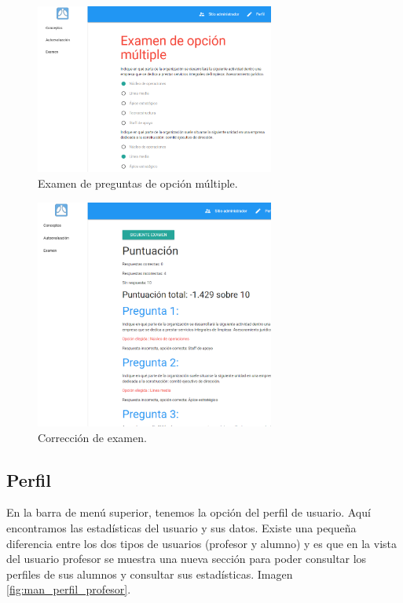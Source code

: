 \begin{figure}[!H]
 	\centering
 	\includegraphics[width=0.7\textwidth]{../images/manual/examen_opm.png}
    \caption{Examen de preguntas de opción múltiple.}
    \label{fig:man_examen_opm}
\end{figure}



\begin{figure}[!H]
 	\centering
 	\includegraphics[width=0.7\textwidth]{../images/manual/examen_opm_respuesta.png}
    \caption{Corrección de examen.}
    \label{fig:man_examen_opm_respuesta}
\end{figure}



\subsection{Perfil}
\bigskip
En la barra de menú superior, tenemos la opción del perfil de usuario. Aquí encontramos las estadísticas del usuario y sus datos. Existe una pequeña diferencia entre los dos tipos de usuarios (profesor y alumno) y es que en la vista del usuario profesor se muestra una nueva sección para poder consultar los perfiles de sus alumnos y consultar sus estadísticas.
 Imagen \ref{fig:man_perfil_profesor}.


